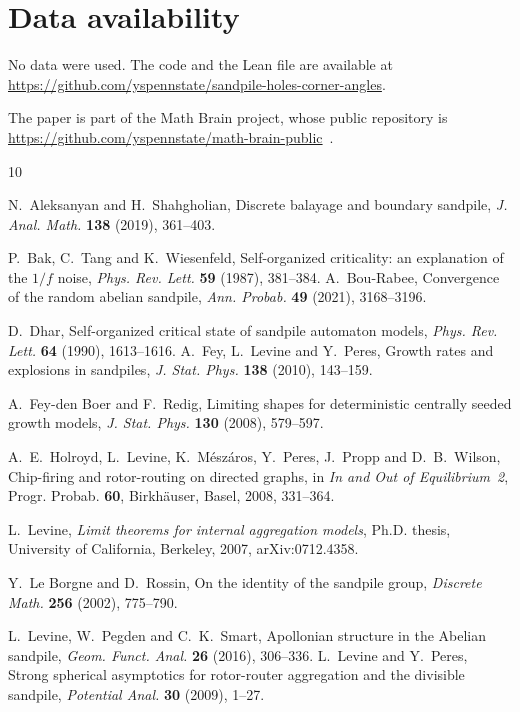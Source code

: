 \documentclass[11pt]{amsart}
\theoremstyle{remark}
\numberwithin{equation}{section}
\begin{document}
\section*{Data availability}
No data were used. The code and the Lean file are available at\\ \url{https://github.com/yspennstate/sandpile-holes-corner-angles}.

The paper is part of the Math Brain project, whose public repository is \url{https://github.com/yspennstate/math-brain-public}~\cite{MathBrainRepo}.

\begin{thebibliography}{10}

N.~Aleksanyan and H.~Shahgholian, Discrete balayage and boundary sandpile, \emph{J. Anal. Math.} \textbf{138} (2019), 361--403.

P.~Bak, C.~Tang and K.~Wiesenfeld, Self-organized criticality: an explanation of the $1/f$ noise, \emph{Phys. Rev. Lett.} \textbf{59} (1987), 381--384.
A.~Bou-Rabee, Convergence of the random abelian sandpile, \emph{Ann. Probab.} \textbf{49} (2021), 3168--3196.

D.~Dhar, Self-organized critical state of sandpile automaton models, \emph{Phys. Rev. Lett.} \textbf{64} (1990), 1613--1616.
A.~Fey, L.~Levine and Y.~Peres, Growth rates and explosions in sandpiles, \emph{J. Stat. Phys.} \textbf{138} (2010), 143--159.

A.~Fey-den Boer and F.~Redig, Limiting shapes for deterministic centrally seeded growth models, \emph{J. Stat. Phys.} \textbf{130} (2008), 579--597.

A.~E.~Holroyd, L.~Levine, K.~M\'esz\'aros, Y.~Peres, J.~Propp and D.~B.~Wilson, Chip-firing and rotor-routing on directed graphs, in \emph{In and Out of Equilibrium~2}, Progr. Probab. \textbf{60}, Birkh\"auser, Basel, 2008, 331--364.

L.~Levine, \emph{Limit theorems for internal aggregation models}, Ph.D. thesis, University of California, Berkeley, 2007, arXiv:0712.4358.

Y.~Le Borgne and D.~Rossin, On the identity of the sandpile group, \emph{Discrete Math.} \textbf{256} (2002), 775--790.

L.~Levine, W.~Pegden and C.~K.~Smart, Apollonian structure in the Abelian sandpile, \emph{Geom. Funct. Anal.} \textbf{26} (2016), 306--336.
L.~Levine and Y.~Peres, Strong spherical asymptotics for rotor-router aggregation and the divisible sandpile, \emph{Potential Anal.} \textbf{30} (2009), 1--27.


\end{thebibliography}
\end{document}
